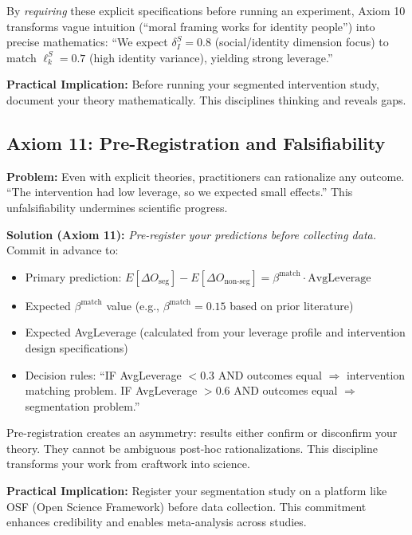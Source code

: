 By \emph{requiring} these explicit specifications before running an experiment, Axiom 10 transforms vague intuition (``moral framing works for identity people'') into precise mathematics: ``We expect $\delta_I^S = 0.8$ (social/identity dimension focus) to match $\ell_k^S = 0.7$ (high identity variance), yielding strong leverage.''

\textbf{Practical Implication:} Before running your segmented intervention study, document your theory mathematically. This disciplines thinking and reveals gaps. \cite{popper1959logic, angrist2010mostly}

\subsection{Axiom 11: Pre-Registration and Falsifiability}

\textbf{Problem:} Even with explicit theories, practitioners can rationalize any outcome. ``The intervention had low leverage, so we expected small effects.'' This unfalsifiability undermines scientific progress.

\textbf{Solution (Axiom 11):} \emph{Pre-register your predictions before collecting data.} Commit in advance to:

\begin{itemize}[nosep]
\item Primary prediction: $E[\Delta O_{\text{seg}}] - E[\Delta O_{\text{non-seg}}] = \beta^{\text{match}} \cdot \text{AvgLeverage}$
\item Expected $\beta^{\text{match}}$ value (e.g., $\beta^{\text{match}} = 0.15$ based on prior literature)
\item Expected AvgLeverage (calculated from your leverage profile and intervention design specifications)
\item Decision rules: ``IF AvgLeverage $< 0.3$ AND outcomes equal $\Rightarrow$ intervention matching problem. IF AvgLeverage $> 0.6$ AND outcomes equal $\Rightarrow$ segmentation problem.''
\end{itemize}

Pre-registration creates an asymmetry: results either confirm or disconfirm your theory. They cannot be ambiguous post-hoc rationalizations. This discipline transforms your work from craftwork into science. \cite{nosek2018registered, osc2015}

\textbf{Practical Implication:} Register your segmentation study on a platform like OSF (Open Science Framework) before data collection. This commitment enhances credibility and enables meta-analysis across studies.


